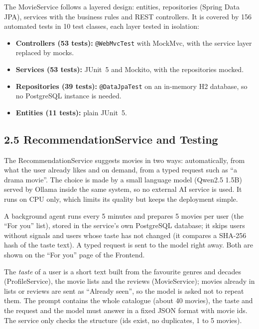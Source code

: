 \documentclass[10pt,a4paper]{article}
\begin{document}
The MovieService follows a layered design: entities, repositories (Spring Data JPA), services with the business rules and REST controllers. It is covered by 156 automated tests in 10 test classes, each layer tested in isolation:
\begin{itemize}
  \item \textbf{Controllers (53 tests):} \texttt{@WebMvcTest} with MockMvc, with the service layer replaced by mocks.
  \item \textbf{Services (53 tests):} JUnit~5 and Mockito, with the repositories mocked.
  \item \textbf{Repositories (39 tests):} \texttt{@DataJpaTest} on an in-memory H2 database, so no PostgreSQL instance is needed.
  \item \textbf{Entities (11 tests):} plain JUnit~5.
\end{itemize}

\subsection*{2.5 RecommendationService and Testing}

The RecommendationService suggests movies in two ways: automatically, from what the user already likes and on demand, from a typed request
such as ``a drama movie''. The choice is made by a small language model (Qwen2.5 1.5B) served by Ollama inside the same system, so
no external AI service is used. It runs on CPU only, which limits its quality but keeps the deployment simple.

A background agent runs every 5 minutes and prepares 5 movies per user (the ``For you'' list), stored in the service's own PostgreSQL
database; it skips users without signals and users whose taste has not changed (it compares a SHA-256 hash of the taste text).
A typed request is sent to the model right away. Both are shown on the ``For you'' page of the Frontend.

The \emph{taste} of a user is a short text built from the favourite genres and decades (ProfileService), the movie lists
and the reviews (MovieService); movies already in lists or reviews are sent as ``Already seen'', so the model is asked not
to repeat them. The prompt contains the whole catalogue (about 40 movies), the taste and the request and the model must
answer in a fixed JSON format with movie ids. The service only checks the structure (ids exist, no duplicates, 1 to 5 movies).
\end{document}
